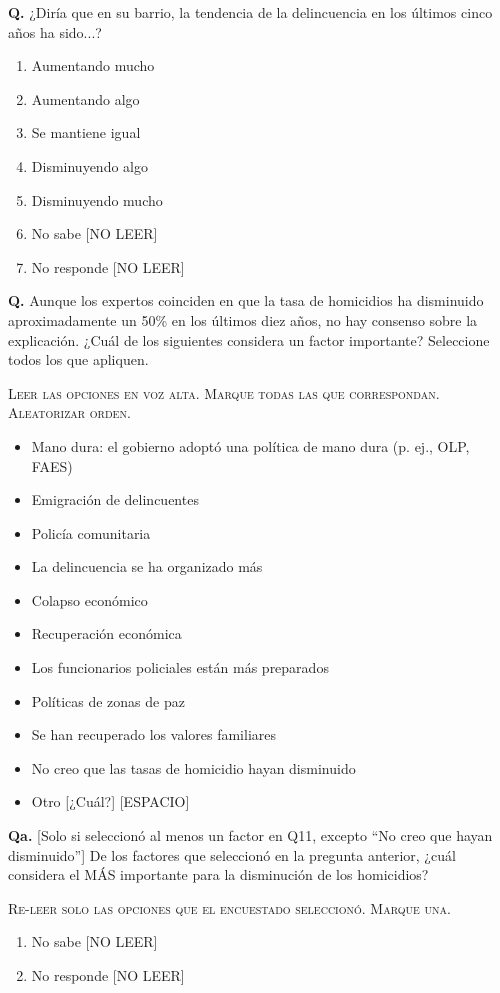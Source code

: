 \documentclass[11pt,letterpaper]{article}
\newcounter{question}
\newcommand{\question}[1]{%
  \stepcounter{question}%
  \vspace{0.3em}%
  \noindent\textbf{Q\thequestion.} #1%
}
\newcommand{\subquestion}[2]{%
  \vspace{0.3em}%
  \noindent\textbf{Q\thequestion#1.} #2%
}
\newcommand{\instruction}[1]{%
  \vspace{0.1em}%
  \noindent\textsc{\small #1}%
  \vspace{0.1em}%
}
\newenvironment{responses}
{\begin{enumerate}[label=(\arabic*), leftmargin=2em, itemsep=0em, parsep=0em, topsep=0em]}
{\end{enumerate}\vspace{0.3em}}
\newenvironment{multiplechoice}
{\begin{itemize}[label=\textbf{[~]}, leftmargin=2em, itemsep=0em, parsep=0em, topsep=0em]}
{\end{itemize}\vspace{0.3em}}
\begin{document}
\question{¿Diría que en su barrio, la tendencia de la delincuencia en los últimos cinco años ha sido...?}
\begin{responses}
\item Aumentando mucho
\item Aumentando algo
\item Se mantiene igual
\item Disminuyendo algo
\item Disminuyendo mucho
\item[(98)] No sabe [NO LEER]
\item[(99)] No responde [NO LEER]
\end{responses}

\question{Aunque los expertos coinciden en que la tasa de homicidios ha disminuido aproximadamente un 50\% en los últimos diez años, no hay consenso sobre la explicación. ¿Cuál de los siguientes considera un factor importante? Seleccione todos los que apliquen.}

\instruction{Leer las opciones en voz alta. Marque todas las que correspondan. Aleatorizar orden.}
\begin{multiplechoice}
\item Mano dura: el gobierno adoptó una política de mano dura (p. ej., OLP, FAES)
\item Emigración de delincuentes
\item Policía comunitaria
\item La delincuencia se ha organizado más
\item Colapso económico
\item Recuperación económica
\item Los funcionarios policiales están más preparados
\item Políticas de zonas de paz
\item Se han recuperado los valores familiares
\item No creo que las tasas de homicidio hayan disminuido
\item Otro [¿Cuál?] [ESPACIO]
\end{multiplechoice}

\subquestion{a}{[Solo si seleccionó al menos un factor en Q11, excepto ``No creo que hayan disminuido''] De los factores que seleccionó en la pregunta anterior, ¿cuál considera el MÁS importante para la disminución de los homicidios?}

\instruction{Re-leer solo las opciones que el encuestado seleccionó. Marque una.}
\begin{responses}
\item[(98)] No sabe [NO LEER]
\item[(99)] No responde [NO LEER]
\end{responses}
\end{document}
